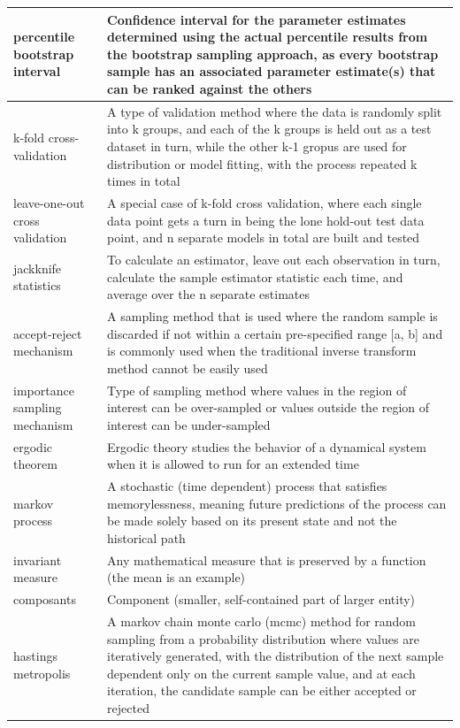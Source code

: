 \documentclass[
]{book}
\begin{document}
\begin{longtable}{>{\raggedright\arraybackslash}p{10em}|>{\raggedright\arraybackslash}p{30em}}
\hline
percentile bootstrap interval & Confidence interval for the parameter estimates determined using the actual percentile results from the bootstrap sampling approach, as every bootstrap sample has an associated parameter estimate(s) that can be ranked against the others\\
\hline
k-fold cross-validation & A type of validation method where the data is randomly split into k groups, and each of the k groups is held out as a test dataset in turn, while the other k-1 gropus are used for distribution or model fitting, with the process repeated k times in total\\
\hline
leave-one-out cross validation & A special case of k-fold cross validation, where each single data point gets a turn in being the lone hold-out test data point, and n separate models in total are built and tested\\
\hline
jackknife statistics & To calculate an estimator, leave out each observation in turn, calculate the sample estimator statistic each time, and average over the n separate estimates\\
\hline
accept-reject mechanism & A sampling method that is used where the random sample is discarded if not within a certain pre-specified range [a, b] and is commonly used when the traditional inverse transform method cannot be easily used\\
\hline
importance sampling mechanism & Type of sampling method where values in the region of interest can be over-sampled or values outside the region of interest can be under-sampled\\
\hline
ergodic theorem & Ergodic theory studies the behavior of a dynamical system when it is allowed to run for an extended time\\
\hline
markov process & A stochastic (time dependent) process that satisfies memorylessness, meaning future predictions of the process can be made solely based on its present state and not the historical path\\
\hline
invariant measure & Any mathematical measure that is preserved by a function (the mean is an example)\\
\hline
composants & Component (smaller, self-contained part of larger entity)\\
\hline
hastings metropolis & A markov chain monte carlo (mcmc) method for random sampling from a probability distribution where values are iteratively generated, with the distribution of the next sample dependent only on the current sample value, and at each iteration, the candidate sample can be either accepted or rejected\\

\end{longtable}
\end{document}

